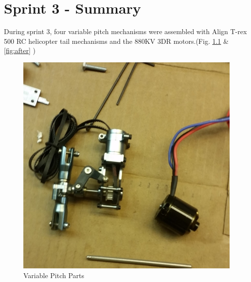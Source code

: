 \chapter{Sprint 3 - Summary}

During sprint 3, four variable pitch mechanisms were assembled with Align T-rex 500 RC helicopter tail mechanisms and the 880KV 3DR motors.(Fig. \ref{fig:before} \& \ref{fig:after} )

\begin{figure}[h]
        \centering
         \begin{minipage}[b]{0.4\textwidth}
            \includegraphics[width = 1\textwidth]{VAPIQ-PICTURES/BeforeAssembly.jpg}
              \caption{Variable Pitch Parts}
            \label{fig:before}
        \end{minipage}
        \hfill
        \begin{minipage}[b]{0.4\textwidth}

\end{minipage}
\end{figure}
